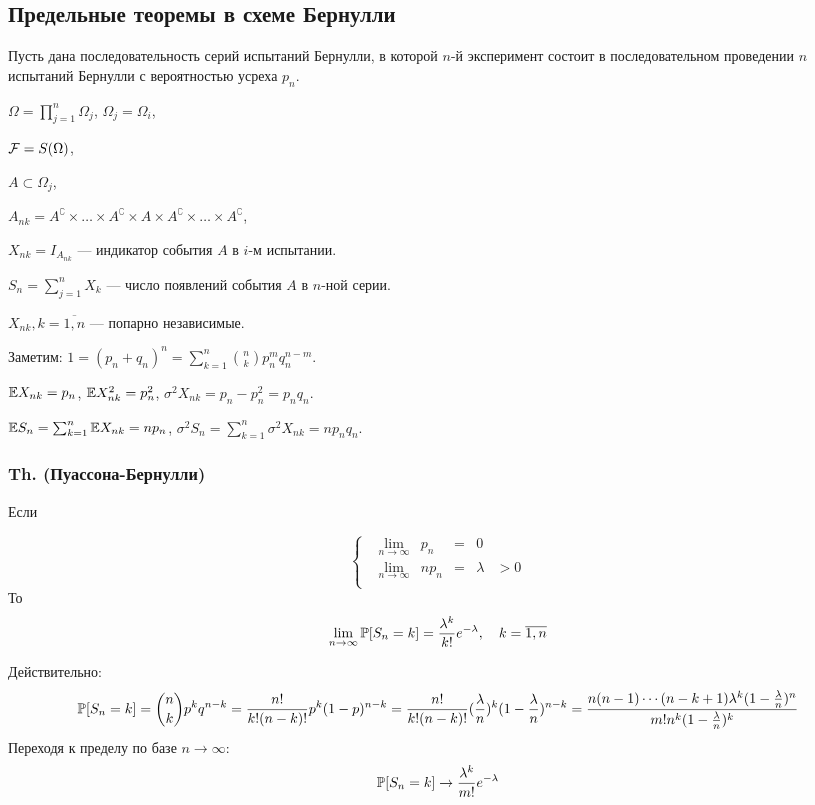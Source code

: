 \subsection{Предельные теоремы в схеме
Бернулли}\label{ux43fux440ux435ux434ux435ux43bux44cux43dux44bux435-ux442ux435ux43eux440ux435ux43cux44b-ux432-ux441ux445ux435ux43cux435-ux431ux435ux440ux43dux443ux43bux43bux438}

Пусть дана последовательность серий испытаний Бернулли, в которой
\(n\)-й эксперимент состоит в последовательном проведении \(n\)
испытаний Бернулли с вероятностью усреха \(p_n\).

\({\Omega = \prod_{j=1}^n \Omega_j}\), \(\Omega_j = \Omega_i\),

\(\mathcal F = S(\Omega)\),

\(A \subset \Omega_j\),

\(A_{n k} = A^\complement \times\ldots\times A^\complement \times A\times A^\complement \times\ldots\times A^\complement\),

\(X_{n k} = I_{A_{nk}}\) --- индикатор события \(A\) в \(i\)-м
испытании.

\(S_n = \sum_{j=1}^n X_k\) --- число появлений события \(A\) в \(n\)-ной
серии.

\(X_{n k}, k=\overline{1,n}\) --- попарно независимые.

Заметим:
\(1 = (p_n+q_n)^n = \sum_{k=1}^n {n\choose k} p_n^m q_n^{n-m}\).

\(\mathbb E X_{n k} = p_n\), \(\mathbb E X_{nk}^2 = p_n^2\),
\(\sigma^2 X_{nk} = p_n - p_n^2 = p_n q_n\).

\(\mathbb E S_n = \sum_{k=1}^n \mathbb E X_{nk} = np_n\),
\(\sigma^2 S_n = \sum_{k=1}^n \sigma^2 X_{nk} = n p_n q_n\).

\subsubsection{Th.
(Пуассона-Бернулли)}\label{th.-ux43fux443ux430ux441ux441ux43eux43dux430-ux431ux435ux440ux43dux443ux43bux43bux438}

Если

\[
\left\{\begin{aligned}
 & \lim_{n\to\infty} & p_n  &=& 0 &\\
 & \lim_{n\to\infty} & np_n &=& \lambda &> 0 \\
\end{aligned}\right.
\] То
\[\lim_{n\to\infty} \mathbb P [S_n = k] = \frac{\lambda^k}{k!} e^{-\lambda}, \quad k=\overline{1,n}\]

Действительно:
\[ \mathbb P [S_n=k] = {n\choose k} p^k q^{n-k} = \frac{n!}{k!(n-k)!} p^k (1-p)^{n-k} =
                 \frac{n!}{k!(n-k)!} (\frac{\lambda}{n})^k(1 - \frac{\lambda}{n})^{n-k} = 
                 \frac{n(n-1)\cdots(n-k+1)\lambda^k(1-\frac{\lambda}{n})^n} {m!n^k (1-\frac{\lambda}{n})^k}\]
Переходя к пределу по базе \(n\to\infty\):
\[ \mathbb P [S_n=k] \to \frac{\lambda^k}{m!}e^{-\lambda}\]

